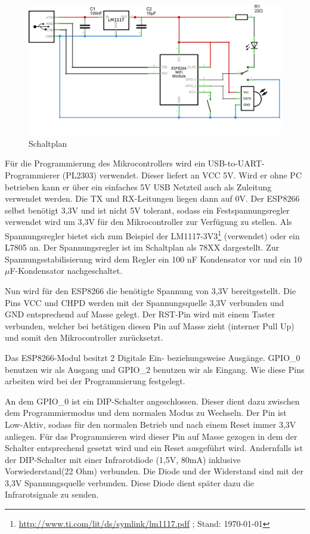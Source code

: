 \begin{figure}
	\centering
	\includegraphics[scale=1.4]{Abbildungen/ESP8266_Schaltplan}
	\caption{Schaltplan}
	\label{fig:Schalplan}
\end{figure}

Für die Programmierung des Mikrocontrollers wird ein USB-to-UART-Programmierer (PL2303) verwendet.
Dieser liefert an VCC 5V. Wird er ohne PC betrieben kann er über ein einfaches 5V USB Netzteil auch als Zuleitung verwendet werden. Die TX und RX-Leitungen liegen dann auf 0V.
Der ESP8266 selbst benötigt 3,3V und ist nicht 5V tolerant, sodass ein Festspannungsregler verwendet wird um 3,3V für den Mikrocontroller zur Verfügung zu stellen.
Als Spannungsregler bietet sich zum Beispiel der LM1117-3V3\footnote{\url{http://www.ti.com/lit/ds/symlink/lm1117.pdf} ; Stand: \today} (verwendet) oder ein L7805 an.
Der Spannungsregler ist im Schaltplan als 78XX dargestellt.
Zur Spannungsstabilisierung wird dem Regler ein 100 nF Kondensator vor und ein 10$\mu$F-Kondensator nachgeschaltet.

Nun wird für den ESP8266 die benötigte Spannung von 3,3V bereitgestellt.
Die Pins \acs{VCC} und \acs{CHPD} werden mit der Spannungsquelle 3,3V verbunden und \ac{GND} entsprechend auf Masse gelegt.
Der \acs{RST}-Pin wird mit einem Taster verbunden, welcher bei betätigen diesen Pin auf Masse zieht (interner Pull Up) und somit den Mikrocontroller zurücksetzt.

Das ESP8266-Modul besitzt 2 Digitale Ein- beziehungsweise Ausgänge. \acs{GPIO}\_0 benutzen wir als Ausgang und \acs{GPIO}\_2 benutzen wir als Eingang.
Wie diese Pins arbeiten wird bei der Programmierung festgelegt.

An dem {GPIO}\_0 ist ein DIP-Schalter angeschlossen.
Dieser dient dazu zwischen dem Programmiermodus und dem normalen Modus zu Wechseln.
Der Pin ist Low-Aktiv, sodass für den normalen Betrieb und nach einem Reset immer 3,3V anliegen.
Für das Programmieren wird dieser Pin auf Masse gezogen in dem der Schalter entsprechend gesetzt wird und ein Reset ausgeführt wird.
Andernfalls ist der DIP-Schalter mit einer Infrarotdiode (1,5V, 80mA) inklusive Vorwiederstand(22 Ohm) verbunden.
Die Diode und der Widerstand sind mit der 3,3V Spannungsquelle verbunden.
Diese Diode dient später dazu die Infrarotsignale zu senden.

